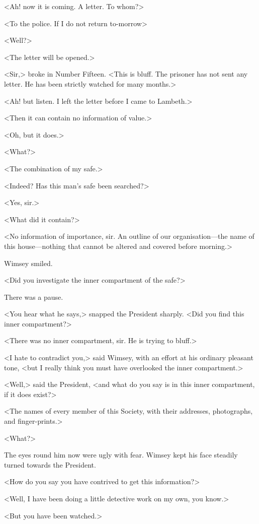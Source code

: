 <Ah! now it is coming. A letter. To whom?>

<To the police. If I do not return to-morrow\longdash>

<Well?>

<The letter will be opened.>

<Sir,> broke in Number Fifteen. <This is bluff. The prisoner has not sent any letter. He has been strictly watched for many months.>

<Ah! but listen. I left the letter before I came to Lambeth.>

<Then it can contain no information of value.>

<Oh, but it does.>

<What?>

<The combination of my safe.>

<Indeed? Has this man's safe been searched?>

<Yes, sir.>

<What did it contain?>

<No information of importance, sir. An outline of our organisation—the name of this house—nothing that cannot be altered and covered before morning.>

Wimsey smiled.

<Did you investigate the inner compartment of the safe?>

There was a pause.

<You hear what he says,> snapped the President sharply. <Did you find this inner compartment?>

<There was no inner compartment, sir. He is trying to bluff.>

<I hate to contradict you,> said Wimsey, with an effort at his ordinary pleasant tone, <but I really think you must have overlooked the inner compartment.>

<Well,> said the President, <and what do you say is in this inner compartment, if it does exist?>

<The names of every member of this Society, with their addresses, photographs, and finger-prints.>

<What?>

The eyes round him now were ugly with fear. Wimsey kept his face steadily turned towards the President.

<How do you say you have contrived to get this information?>

<Well, I have been doing a little detective work on my own, you know.>

<But you have been watched.>

